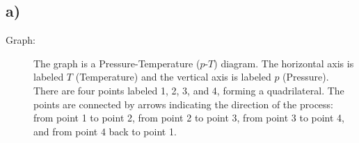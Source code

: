 

\subsection*{a)}

\begin{description}
    \item[Graph:] The graph is a Pressure-Temperature ($p$-$T$) diagram. The horizontal axis is labeled $T$ (Temperature) and the vertical axis is labeled $p$ (Pressure). There are four points labeled 1, 2, 3, and 4, forming a quadrilateral. The points are connected by arrows indicating the direction of the process: from point 1 to point 2, from point 2 to point 3, from point 3 to point 4, and from point 4 back to point 1.
\end{description}